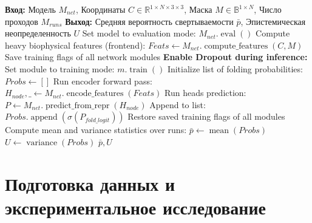\documentclass[12pt, a4paper]{article}
\begin{document}
\begin{algorithm}[h]
\caption{Оценка неопределенности методом MC-Dropout}
\label{alg:mcdropout}
\begin{algorithmic}[1]
\Statex \textbf{Вход:} Модель $M_{net}$, Координаты $C \in \mathbb{R}^{1 \times N \times 3 \times 3}$, Маска $M \in \mathbb{B}^{1 \times N}$, Число проходов $M_{runs}$
\Statex \textbf{Выход:} Средняя вероятность свертываемости $\bar{p}$, Эпистемическая неопределенность $U$
\State Set model to evaluation mode: $M_{net}.\operatorname{eval}()$
\State Compute heavy biophysical features (frontend):
\State \quad $Feats \gets M_{net}.\operatorname{compute\_features}(C, M)$ 
\State Save training flags of all network modules
\State \textbf{Enable Dropout during inference:}
        \State Set module to training mode: $m.\operatorname{train}()$
    \EndIf
\EndFor
\State Initialize list of folding probabilities: $Probs \gets []$
    \State Run encoder forward pass: $H_{node}, \_ \gets M_{net}.\operatorname{encode\_features}(Feats)$
    \State Run heads prediction: $P \gets M_{net}.\operatorname{predict\_from\_repr}(H_{node})$
    \State Append to list: $Probs.\operatorname{append}(\sigma(P_{fold\_logit}))$
\EndFor
\State Restore saved training flags of all modules
\State Compute mean and variance statistics over runs:
\State \quad $\bar{p} \gets \operatorname{mean}(Probs)$
\State \quad $U \gets \operatorname{variance}(Probs)$
\State \Return $\bar{p}, U$
\end{algorithmic}
\end{algorithm}

\newpage

\section{Подготовка данных и экспериментальное исследование}
\end{document}
